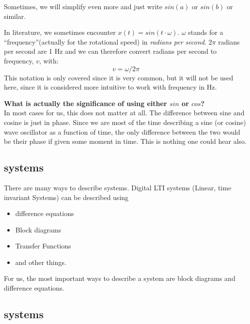 Sometimes, we will simplify even more and just write $sin(a)$ or $sin(b)$ or similar.\\
\begin{mdframed}[backgroundcolor=black!10,rightline=false,leftline=false]
In literature, we sometimes encounter $x(t) = sin(t \cdot \omega)$. $\omega$ stands for a ``frequency''(actually for the rotational speed) in \textit{radians per second}. $2\pi$ radians per second are 1 Hz and we can therefore convert radians per second to frequency, $v$, with:
\begin{equation}
  	v = \omega / 2\pi
  \end{equation}
This notation is only covered since it is very common, but it will not be used here, since it is considered more intuitive to work with frequency in Hz.
\vspace{0.5cm}

\textbf{What is actually the significance of using either $sin$ or $cos$?}\\
In most cases for us, this does not matter at all. The difference between sine and cosine is just in phase. Since we are most of the time describing a sine (or cosine) wave oscillator as a function of time, the only difference between the two would be their phase if given some moment in time. This is nothing one could hear also.

\end{mdframed}

\subsection{systems}
There are many ways to describe systems. Digital LTI systems (Linear, time invariant Systems) can be described using
\begin{itemize}
	\item difference equations
	\item Block diagrams
	\item Transfer Functions
	\item and other things.
\end{itemize}

For us, the most important ways to describe a system are block diagrams and difference equations.

\subsection{systems}


